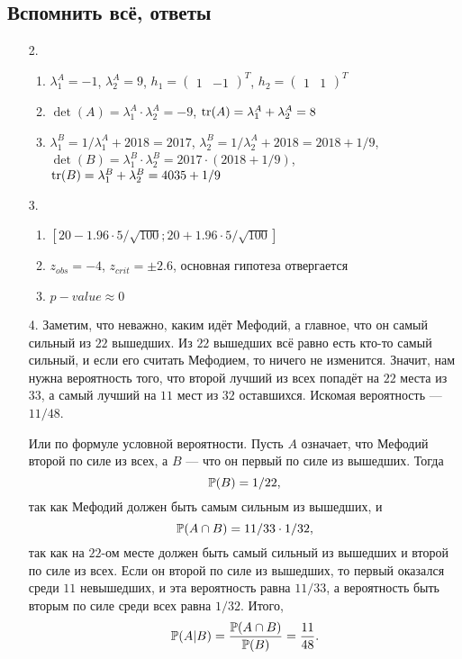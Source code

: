 \subsection{Вспомнить всё, ответы}

\begin{enumerate}
\item[2.]
\begin{enumerate}
  \item $\lambda^A_1 = -1$, $\lambda^A_2 = 9$,
  $h_1 = \begin{pmatrix}
  1 & -1
  \end{pmatrix}^T$,
  $h_2 = \begin{pmatrix}
  1 & 1
  \end{pmatrix}^T$
  \item $\det(A) = \lambda^A_1 \cdot \lambda^A_2 = -9$, $\tr(A) = \lambda^A_1 +
  \lambda^A_2 = 8$
  \item $\lambda^B_1 = 1 / \lambda^A_1 + 2018 = 2017$,
  $\lambda^B_2 = 1 / \lambda^A_2 + 2018 = 2018 + 1/9$,
  $\det(B) = \lambda^B_1 \cdot \lambda^B_2 = 2017 \cdot (2018 + 1/9)$,
  $\tr(B) = \lambda^B_1 + \lambda^B_2 = 4035 + 1/9$
\end{enumerate}
\item[3.]
\begin{enumerate}
\item $\left[20 - 1.96 \cdot 5 / \sqrt{100}; 20 + 1.96 \cdot 5 / \sqrt{100} \right]$
\item $z_{obs} = -4$, $z_{crit} = \pm 2.6$, основная гипотеза отвергается
\item $p-value \approx 0 $
\end{enumerate}
\item[4.] Заметим, что неважно, каким идёт Мефодий, а главное, что он самый сильный из
$22$ вышедших. Из $22$ вышедших всё равно есть кто-то самый сильный, и если его
считать Мефодием, то ничего не изменится. Значит, нам нужна вероятность того,
что второй лучший из всех попадёт на $22$ места из $33$, а самый лучший на $11$
мест из $32$ оставшихся. Искомая вероятность — $11/48$.

Или по формуле условной вероятности. Пусть $A$ означает, что Мефодий второй по силе
из всех, а $B$ — что он первый по силе из вышедших. Тогда
\[
\P(B) = 1/22,
\]
так как Мефодий должен быть самым сильным из вышедших, и
\[
\P(A \cap B) = 11/33 \cdot 1/32,
\]
так как на $22$-ом месте должен быть самый сильный из вышедших и второй по силе из
всех. Если он второй по силе из вышедших, то первый оказался среди $11$ невышедших,
и эта вероятность равна $11/33$, а вероятность быть вторым по силе среди всех равна
$1/32$. Итого,
\[
\P(A|B) = \frac{\P(A \cap B)}{\P(B)} = \frac{11}{48}.
\]
\end{enumerate}
